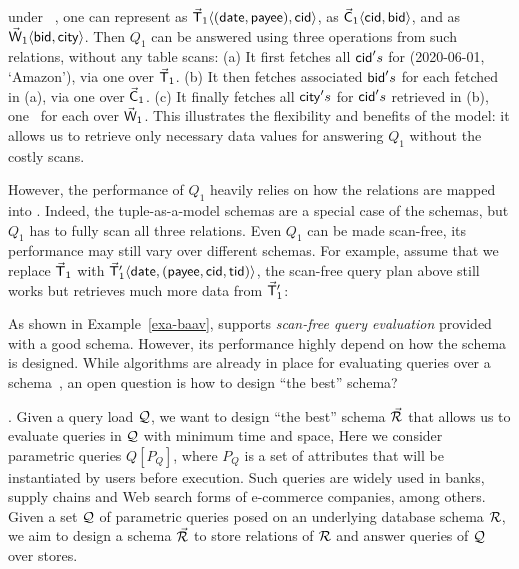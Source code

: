 \begin{example}\label{exa-baav}
under \baav~\cite{VLDB19}, one can represent  as
$\vec{\protect\mathsf{T}}_{1}\langle (\protect\mathsf{date},\allowbreak \protect\mathsf{payee}),\allowbreak \protect\mathsf{cid}\rangle$,
 as $\vec{\protect\mathsf{C}}_{1}\langle \protect\mathsf{cid},\allowbreak \protect\mathsf{bid}\rangle$,
and  as $\vec{\protect\mathsf{W}}_{1}\langle \protect\mathsf{bid},\allowbreak \protect\mathsf{city}\rangle$.
Then $Q_{1}$ can be answered using three \get operations
from such relations, without any table scans:
(a) It first fetches all $\protect\mathsf{cid}'s$ for ({\normalsize 2020-06-01},
{\normalsize `Amazon'}), via one \get over $\vec{\protect\mathsf{T}}_{1}$.
(b) It then fetches associated $\protect\mathsf{bid}'s$ for each
 fetched in (a), via one \get over $\vec{\protect\mathsf{C}}_{1}$.
(c) It finally fetches all $\protect\mathsf{city}'s$ for $\protect\mathsf{cid}'s$
retrieved in (b), one \get~for %
each  over $\vec{\protect\mathsf{W}}_{1}$.
This illustrates the flexibility and benefits of the \baav
model: it allows us to retrieve only necessary data values for
answering $Q_{1}$ without the costly scans. %

However, the performance of $Q_{1}$ heavily relies on %
how
the relations are mapped into \baav. %
Indeed, the
tuple-as-a-model schemas are a special case of the \baav
schemas, but $Q_{1}$ has to fully scan all three relations. Even $Q_{1}$
can be made scan-free, its performance may still vary over
different \baav schemas. For example, assume that
we replace $\vec{\protect\mathsf{T}}_{1}$
with $\vec{\protect\mathsf{T}}_{1}'\langle \protect\mathsf{date},\allowbreak (\protect\mathsf{payee},\allowbreak
  \protect\mathsf{cid},\allowbreak \protect\mathsf{tid})\rangle$, the %
scan-free query %
plan above
still works but retrieves much %
more data %
from $\vec{\protect\mathsf{T}}_{1}'$:
\end{example}


As shown in Example~\ref{exa-baav}, \baav supports {\em scan-free
query evaluation} provided with a good \baav schema.  However,
its performance highly depend on how the schema is designed.
While algorithms are already in place for %
evaluating %
queries over a \baav schema~\cite{VLDB19}, an open question is
how to design ``the best'' \baav schema?

. %
Given a query load
$\mathcal Q$, we want to design ``the best'' \baav schema
$\vec{{\mathcal R}}$ that allows us to evaluate queries in $\mathcal Q$
with minimum time and space, 
Here we consider parametric \SQL 
queries $Q[P_Q]$, where $P_Q$ is a set of attributes
that will be instantiated by users before execution.
Such queries are widely used in banks, supply chains and
Web search forms of e-commerce companies, among others.
Given a
set $\mathcal Q$ of parametric \SQL queries posed on an underlying
database schema ${\mathcal R}$, we aim to design a \baav schema
$\vec{{\mathcal R}}$ to store relations of ${\mathcal R}$ and 
answer queries of $\mathcal Q$ over \kv stores.

